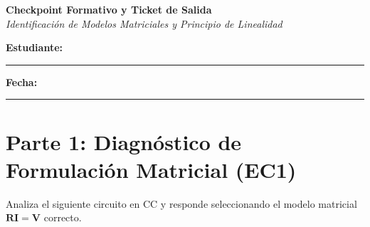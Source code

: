 \documentclass[11pt, a4paper]{article}
\begin{document}
\begin{center}
    {\Large \textbf{Checkpoint Formativo y Ticket de Salida}} \\[0.2cm]
    \textit{Identificación de Modelos Matriciales y Principio de Linealidad}
\end{center}

\textbf{Estudiante:} \rule{8cm}{0.4pt} \hfill \textbf{Fecha:} \rule{3cm}{0.4pt}
\vspace{0.4cm}

\section*{Parte 1: Diagnóstico de Formulación Matricial (EC1)}
Analiza el siguiente circuito en CC y responde seleccionando el modelo matricial $\mathbf{R}\mathbf{I} = \mathbf{V}$ correcto. 
\end{document}
